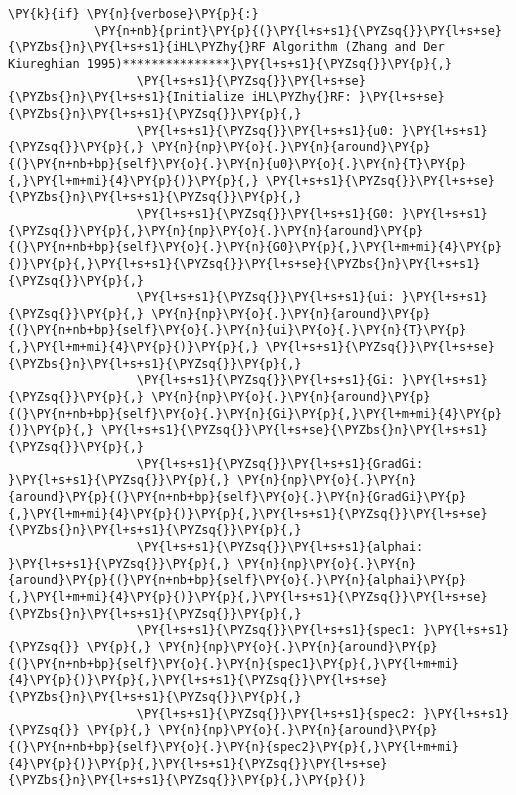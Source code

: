 \begin{tcolorbox}[breakable, size=fbox, boxrule=1pt, pad at break*=1mm,colback=cellbackground, colframe=cellborder]
\begin{Verbatim}[commandchars=\\\{\}]
        \PY{k}{if} \PY{n}{verbose}\PY{p}{:}
            \PY{n+nb}{print}\PY{p}{(}\PY{l+s+s1}{\PYZsq{}}\PY{l+s+se}{\PYZbs{}n}\PY{l+s+s1}{iHL\PYZhy{}RF Algorithm (Zhang and Der Kiureghian 1995)***************}\PY{l+s+s1}{\PYZsq{}}\PY{p}{,}
                  \PY{l+s+s1}{\PYZsq{}}\PY{l+s+se}{\PYZbs{}n}\PY{l+s+s1}{Initialize iHL\PYZhy{}RF: }\PY{l+s+se}{\PYZbs{}n}\PY{l+s+s1}{\PYZsq{}}\PY{p}{,}
                  \PY{l+s+s1}{\PYZsq{}}\PY{l+s+s1}{u0: }\PY{l+s+s1}{\PYZsq{}}\PY{p}{,} \PY{n}{np}\PY{o}{.}\PY{n}{around}\PY{p}{(}\PY{n+nb+bp}{self}\PY{o}{.}\PY{n}{u0}\PY{o}{.}\PY{n}{T}\PY{p}{,}\PY{l+m+mi}{4}\PY{p}{)}\PY{p}{,} \PY{l+s+s1}{\PYZsq{}}\PY{l+s+se}{\PYZbs{}n}\PY{l+s+s1}{\PYZsq{}}\PY{p}{,}
                  \PY{l+s+s1}{\PYZsq{}}\PY{l+s+s1}{G0: }\PY{l+s+s1}{\PYZsq{}}\PY{p}{,}\PY{n}{np}\PY{o}{.}\PY{n}{around}\PY{p}{(}\PY{n+nb+bp}{self}\PY{o}{.}\PY{n}{G0}\PY{p}{,}\PY{l+m+mi}{4}\PY{p}{)}\PY{p}{,}\PY{l+s+s1}{\PYZsq{}}\PY{l+s+se}{\PYZbs{}n}\PY{l+s+s1}{\PYZsq{}}\PY{p}{,}
                  \PY{l+s+s1}{\PYZsq{}}\PY{l+s+s1}{ui: }\PY{l+s+s1}{\PYZsq{}}\PY{p}{,} \PY{n}{np}\PY{o}{.}\PY{n}{around}\PY{p}{(}\PY{n+nb+bp}{self}\PY{o}{.}\PY{n}{ui}\PY{o}{.}\PY{n}{T}\PY{p}{,}\PY{l+m+mi}{4}\PY{p}{)}\PY{p}{,} \PY{l+s+s1}{\PYZsq{}}\PY{l+s+se}{\PYZbs{}n}\PY{l+s+s1}{\PYZsq{}}\PY{p}{,}
                  \PY{l+s+s1}{\PYZsq{}}\PY{l+s+s1}{Gi: }\PY{l+s+s1}{\PYZsq{}}\PY{p}{,} \PY{n}{np}\PY{o}{.}\PY{n}{around}\PY{p}{(}\PY{n+nb+bp}{self}\PY{o}{.}\PY{n}{Gi}\PY{p}{,}\PY{l+m+mi}{4}\PY{p}{)}\PY{p}{,} \PY{l+s+s1}{\PYZsq{}}\PY{l+s+se}{\PYZbs{}n}\PY{l+s+s1}{\PYZsq{}}\PY{p}{,}
                  \PY{l+s+s1}{\PYZsq{}}\PY{l+s+s1}{GradGi: }\PY{l+s+s1}{\PYZsq{}}\PY{p}{,} \PY{n}{np}\PY{o}{.}\PY{n}{around}\PY{p}{(}\PY{n+nb+bp}{self}\PY{o}{.}\PY{n}{GradGi}\PY{p}{,}\PY{l+m+mi}{4}\PY{p}{)}\PY{p}{,}\PY{l+s+s1}{\PYZsq{}}\PY{l+s+se}{\PYZbs{}n}\PY{l+s+s1}{\PYZsq{}}\PY{p}{,}
                  \PY{l+s+s1}{\PYZsq{}}\PY{l+s+s1}{alphai: }\PY{l+s+s1}{\PYZsq{}}\PY{p}{,} \PY{n}{np}\PY{o}{.}\PY{n}{around}\PY{p}{(}\PY{n+nb+bp}{self}\PY{o}{.}\PY{n}{alphai}\PY{p}{,}\PY{l+m+mi}{4}\PY{p}{)}\PY{p}{,}\PY{l+s+s1}{\PYZsq{}}\PY{l+s+se}{\PYZbs{}n}\PY{l+s+s1}{\PYZsq{}}\PY{p}{,}
                  \PY{l+s+s1}{\PYZsq{}}\PY{l+s+s1}{spec1: }\PY{l+s+s1}{\PYZsq{}} \PY{p}{,} \PY{n}{np}\PY{o}{.}\PY{n}{around}\PY{p}{(}\PY{n+nb+bp}{self}\PY{o}{.}\PY{n}{spec1}\PY{p}{,}\PY{l+m+mi}{4}\PY{p}{)}\PY{p}{,}\PY{l+s+s1}{\PYZsq{}}\PY{l+s+se}{\PYZbs{}n}\PY{l+s+s1}{\PYZsq{}}\PY{p}{,}
                  \PY{l+s+s1}{\PYZsq{}}\PY{l+s+s1}{spec2: }\PY{l+s+s1}{\PYZsq{}} \PY{p}{,} \PY{n}{np}\PY{o}{.}\PY{n}{around}\PY{p}{(}\PY{n+nb+bp}{self}\PY{o}{.}\PY{n}{spec2}\PY{p}{,}\PY{l+m+mi}{4}\PY{p}{)}\PY{p}{,}\PY{l+s+s1}{\PYZsq{}}\PY{l+s+se}{\PYZbs{}n}\PY{l+s+s1}{\PYZsq{}}\PY{p}{,}\PY{p}{)}
    

\end{Verbatim}
\end{tcolorbox}
